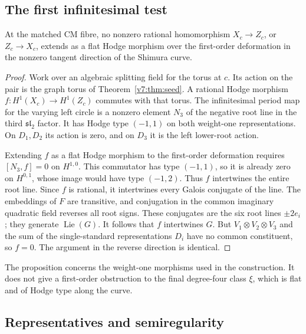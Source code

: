 \subsection{The first infinitesimal test}\label{v7:sec:firstorder}

\begin{proposition}\label{v7:prop:firstorder}
At the matched CM fibre, no nonzero rational homomorphism \(X_c\to Z_c\), or \(Z_c\to X_c\), extends as a flat Hodge morphism over the first-order deformation in the nonzero tangent direction of the Shimura curve.
\end{proposition}
\begin{proof}
Work over an algebraic splitting field for the torus at \(c\). Its action on the pair is the graph torus of Theorem~\ref{v7:thm:seed}. A rational Hodge morphism \(f:H^1(X_c)\to H^1(Z_c)\) commutes with that torus. The infinitesimal period map for the varying left circle is a nonzero element \(N_3\) of the negative root line in the third \(\mathfrak{sl}_2\) factor. It has Hodge type \((-1,1)\) on both weight-one representations. On \(D_1,D_2\) its action is zero, and on \(D_3\) it is the left lower-root action.

Extending \(f\) as a flat Hodge morphism to the first-order deformation requires \([N_3,f]=0\) on \(H^{1,0}\). This commutator has type \((-1,1)\), so it is already zero on \(H^{0,1}\), whose image would have type \((-1,2)\). Thus \(f\) intertwines the entire root line. Since \(f\) is rational, it intertwines every Galois conjugate of the line. The embeddings of \(F\) are transitive, and conjugation in the common imaginary quadratic field reverses all root signs. These conjugates are the six root lines \(\pm2e_i\); they generate \(\operatorname{Lie}(G)\). It follows that \(f\) intertwines \(G\). But \(V_1\otimes V_2\otimes V_3\) and the sum of the single-standard representations \(D_i\) have no common constituent, so \(f=0\). The argument in the reverse direction is identical.
\end{proof}

The proposition concerns the weight-one morphisms used in the construction. It does not give a first-order obstruction to the final degree-four class \(\xi\), which is flat and of Hodge type along the curve.

\subsection{Representatives and semiregularity}

